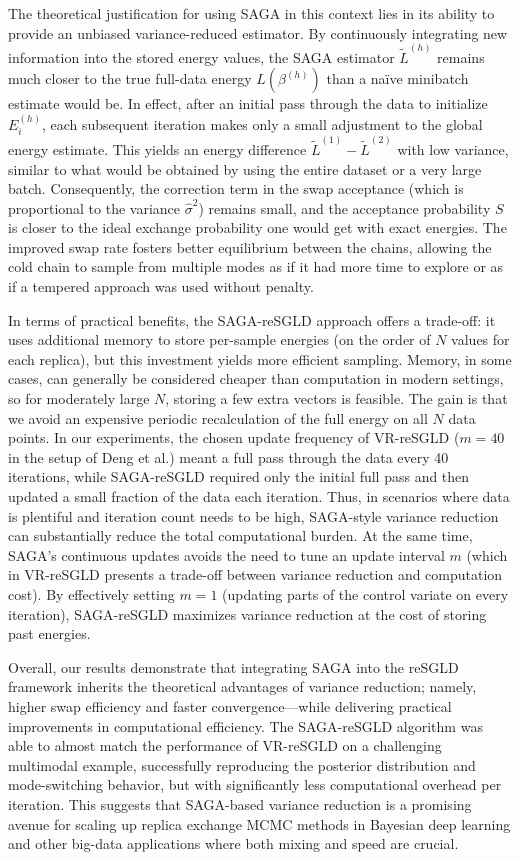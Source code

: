\documentclass{article}
\begin{document}
The theoretical justification for using SAGA in this context lies in its ability to provide an unbiased variance-reduced estimator. By continuously integrating new information into the stored energy values, the SAGA estimator $\tilde{L}^{(h)}$ remains much closer to the true full-data energy $L(\beta^{(h)})$ than a naïve minibatch estimate would be. In effect, after an initial pass through the data to initialize $E_i^{(h)}$, each subsequent iteration makes only a small adjustment to the global energy estimate. This yields an energy difference $\tilde{L}^{(1)} - \tilde{L}^{(2)}$ with low variance, similar to what would be obtained by using the entire dataset or a very large batch. Consequently, the correction term in the swap acceptance (which is proportional to the variance $\hat{\sigma}^2$) remains small, and the acceptance probability $S$ is closer to the ideal exchange probability one would get with exact energies. The improved swap rate fosters better equilibrium between the chains, allowing the cold chain to sample from multiple modes as if it had more time to explore or as if a tempered approach was used without penalty.

In terms of practical benefits, the SAGA-reSGLD approach offers a trade-off: it uses additional memory to store per-sample energies (on the order of $N$ values for each replica), but this investment yields more efficient sampling. Memory, in some cases, can generally be considered cheaper than computation in modern settings, so for moderately large $N$, storing a few extra vectors is feasible. The gain is that we avoid an expensive periodic recalculation of the full energy on all $N$ data points. In our experiments, the chosen update frequency of VR-reSGLD ($m=40$ in the setup of Deng et al.) meant a full pass through the data every 40 iterations, while SAGA-reSGLD required only the initial full pass and then updated a small fraction of the data each iteration. Thus, in scenarios where data is plentiful and iteration count needs to be high, SAGA-style variance reduction can substantially reduce the total computational burden. At the same time, SAGA’s continuous updates avoids the need to tune an update interval $m$ (which in VR-reSGLD presents a trade-off between variance reduction and computation cost). By effectively setting $m=1$ (updating parts of the control variate on every iteration), SAGA-reSGLD maximizes variance reduction at the cost of storing past energies.

Overall, our results demonstrate that integrating SAGA into the reSGLD framework inherits the theoretical advantages of variance reduction; namely, higher swap efficiency and faster convergence—while delivering practical improvements in computational efficiency. The SAGA-reSGLD algorithm was able to almost match the performance of VR-reSGLD on a challenging multimodal example, successfully reproducing the posterior distribution and mode-switching behavior, but with significantly less computational overhead per iteration. This suggests that SAGA-based variance reduction is a promising avenue for scaling up replica exchange MCMC methods in Bayesian deep learning and other big-data applications where both mixing and speed are crucial.
\end{document}
